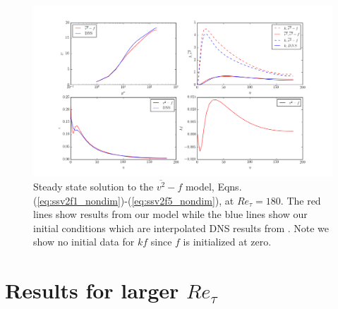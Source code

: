 \documentclass[a4paper,11pt]{article}
\begin{document}
\begin{figure}
 \centering
 \includegraphics[width=\textwidth]{results_180}
 \caption{Steady state solution to the $\overline{v^2}-f$ model, Eqns.
(\ref{eq:ssv2f1_nondim})-(\ref{eq:ssv2f5_nondim}), at $Re_\tau=180$. The red
lines show results from our model while the blue lines show our
initial conditions which are interpolated DNS results from \cite{Lee}. Note we
show no initial data for $kf$ since $f$ is initialized at zero.}
 \label{fig:results_180}
\end{figure}


\section{Results for larger $Re_\tau$}
\end{document}
